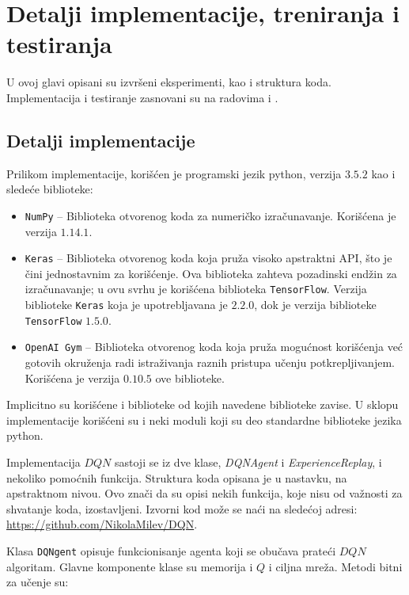 \chapter{Detalji implementacije, treniranja i testiranja}
\label{ch:implementacija}

U ovoj glavi opisani su izvršeni eksperimenti, kao i struktura koda. Implementacija i testiranje zasnovani su na radovima \cite{dqn_mnih} i \cite{dqn_dm}.
\section{Detalji implementacije}
\label{sec:implementacija}
Prilikom implementacije, korišćen je programski jezik python\cite{python}, verzija $3.5.2$ kao i sledeće biblioteke:
\begin{itemize}
	\item \texttt{NumPy}\cite{numpy} -- Biblioteka otvorenog koda za numeričko izračunavanje. Korišćena je verzija $1.14.1$.
	\item \texttt{Keras}\cite{keras} -- Biblioteka otvorenog koda koja pruža visoko apstraktni API, što je čini jednostavnim za korišćenje. Ova biblioteka zahteva pozadinski endžin za izračunavanje; u ovu svrhu je korišćena biblioteka \texttt{TensorFlow}\cite{tensorflow}. Verzija biblioteke \texttt{Keras} koja je upotrebljavana je $2.2.0$, dok je verzija biblioteke \texttt{TensorFlow} $1.5.0$.
	\item  \texttt{OpenAI~Gym}\cite{openai_gym} -- Biblioteka otvorenog koda koja pruža mogućnost korišćenja već gotovih okruženja radi istraživanja raznih pristupa učenju potkrepljivanjem. Korišćena je verzija $0.10.5$ ove biblioteke.
\end{itemize}
Implicitno su korišćene i biblioteke od kojih navedene biblioteke zavise. U sklopu implementacije korišćeni su i neki moduli koji su deo standardne biblioteke jezika python.
\par 
Implementacija $DQN$ sastoji se iz dve klase, {\em DQNAgent} i {\em ExperienceReplay}, i nekoliko pomoćnih funkcija. Struktura koda opisana je u nastavku, na apstraktnom nivou. Ovo znači da su opisi nekih funkcija, koje nisu od važnosti za shvatanje koda, izostavljeni. Izvorni kod može se naći na sledećoj adresi: \url{https://github.com/NikolaMilev/DQN}.
\par 
Klasa \texttt{DQNgent} opisuje funkcionisanje agenta koji se obučava prateći $DQN$ algoritam. Glavne komponente klase su memorija i $Q$ i ciljna mreža. Metodi bitni za učenje su:
